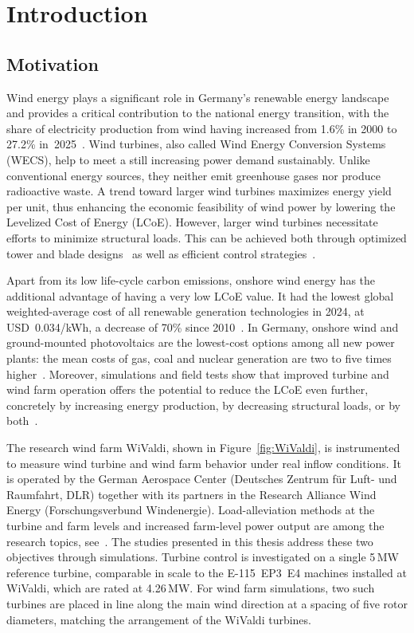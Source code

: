\chapter{Introduction}
\label{sec:Introduction}

\section{Motivation} %
Wind energy plays a significant role in Germany's renewable energy landscape and provides a critical contribution to the national energy transition, with the share of electricity production from wind having increased from 1.6\% in 2000 to 27.2\% in~2025~\cite{EmberEI2026}. Wind turbines, also called Wind Energy Conversion Systems (WECS), help to meet a still increasing power demand sustainably. Unlike conventional energy sources, they neither emit greenhouse gases nor produce radioactive waste. A trend toward larger wind turbines maximizes energy yield per unit, thus enhancing the economic feasibility of wind power by lowering the Levelized Cost of Energy (LCoE). However, larger wind turbines necessitate efforts to minimize structural loads. This can be achieved both through optimized tower and blade designs~\cite{modelling2010006, Jasa_2022} as well as efficient control strategies~\cite{pao2011control}. %

Apart from its low life-cycle carbon emissions, onshore wind energy has the additional advantage of having a very low LCoE value. It had the lowest global weighted-average cost of all renewable generation technologies in 2024, at USD~0.034/kWh, a decrease of 70\% since 2010~\cite{IRENA2025}. In Germany, onshore wind and ground-mounted
photovoltaics are the lowest-cost options among all new power plants: the mean costs of gas,
coal and nuclear generation are two to five times higher~\cite{Kost2024LCOE}. Moreover,
simulations and field tests show that improved turbine and wind farm operation offers the
potential to reduce the LCoE even further, concretely by increasing energy production, by
decreasing structural loads, or by both~\cite{vali2017adjointbasedmodel, houck2022review}.

The research wind farm WiValdi, shown in Figure~\ref{fig:WiValdi}, is instrumented to measure wind turbine and wind farm behavior under real inflow conditions. It is operated by the German Aerospace Center (Deutsches Zentrum für Luft- und Raumfahrt, DLR) together with its partners in the Research Alliance Wind Energy (Forschungsverbund Windenergie). Load-alleviation methods at the turbine and farm levels and increased farm-level power output are among the research
topics, see~\cite{WiValdiResearchTopics}. The studies presented in this thesis address these two objectives through simulations. Turbine
control is investigated on a single 5\,MW reference turbine, comparable in scale to the
E-115~EP3~E4 machines installed at WiValdi, which are rated at 4.26\,MW. For wind farm simulations,
two such turbines are placed in line along the main wind direction at a spacing of five rotor
diameters, matching the arrangement of the WiValdi turbines.

